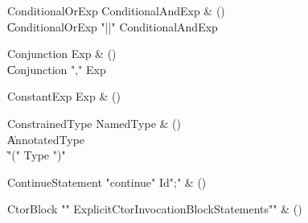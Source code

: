 \begin{bbgrammar}

ConditionalOrExp \label{prod:ConditionalOrExp}  \: ConditionalAndExp & () \\

    \| ConditionalOrExp \xcd"||" ConditionalAndExp \\

\end{bbgrammar}

\begin{bbgrammar}

Conjunction \label{prod:Conjunction}  \: Exp & () \\

    \| Conjunction \xcd"," Exp \\

\end{bbgrammar}

\begin{bbgrammar}

ConstantExp \label{prod:ConstantExp}  \: Exp & () \\


\end{bbgrammar}

\begin{bbgrammar}

ConstrainedType \label{prod:ConstrainedType}  \: NamedType & () \\

    \| AnnotatedType \\
    \| \xcd"(" Type \xcd")" \\

\end{bbgrammar}

\begin{bbgrammar}

ContinueStatement \label{prod:ContinueStatement}  \: \xcd"continue" Id\opt \xcd";" & () \\


\end{bbgrammar}

\begin{bbgrammar}

CtorBlock \label{prod:CtorBlock}  \: \xcd"{" ExplicitCtorInvocation\opt BlockStatements\opt \xcd"}" & () \\


\end{bbgrammar}

